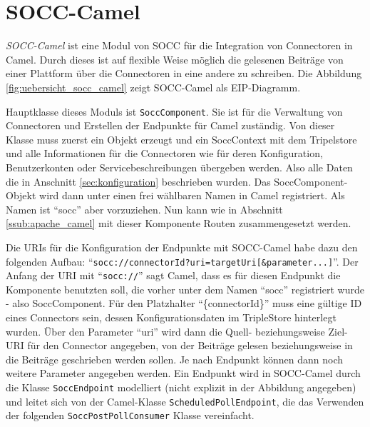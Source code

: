 


\section{SOCC-Camel} %
\label{sec:socc_camel}

\emph{SOCC-Camel} ist eine Modul von SOCC für die Integration von Connectoren in Camel. Durch dieses ist auf flexible Weise möglich die gelesenen Beiträge von einer Plattform über die Connectoren in eine andere zu schreiben. Die Abbildung \ref{fig:uebersicht_socc_camel} zeigt SOCC-Camel als EIP-Diagramm. 

Hauptklasse dieses Moduls ist \texttt{SoccComponent}. Sie ist für die Verwaltung von Connectoren und Erstellen der Endpunkte für Camel zuständig. Von dieser Klasse muss zuerst ein Objekt erzeugt und ein SoccContext mit dem Tripelstore und alle Informationen für die Connectoren wie für deren Konfiguration, Benutzerkonten oder Servicebeschreibungen übergeben werden. Also alle Daten die in Anschnitt \ref{sec:konfiguration} beschrieben wurden. Das SoccComponent-Objekt wird dann unter einen frei wählbaren Namen in Camel registriert. Als Namen ist \enquote{socc} aber vorzuziehen.  Nun kann wie in Abschnitt \ref{ssub:apache_camel} mit dieser Komponente Routen zusammengesetzt werden.

Die URIs für die Konfiguration der Endpunkte mit SOCC-Camel habe dazu den folgenden Aufbau: \enquote{\texttt{socc://{connectorId}?uri={targetUri}[\&{parameter}...]}}. Der Anfang der URI mit \enquote{\texttt{socc://}} sagt Camel, dass es für diesen Endpunkt die Komponente benutzten soll, die vorher unter dem Namen \enquote{socc} registriert wurde - also SoccComponent. Für den Platzhalter \enquote{\{connectorId\}} muss eine gültige ID eines Connectors sein, dessen Konfigurationsdaten im TripleStore hinterlegt wurden. Über den Parameter \enquote{uri} wird dann die Quell- beziehungsweise Ziel-URI für den Connector angegeben, von der Beiträge gelesen beziehungsweise in die Beiträge geschrieben werden sollen. Je nach Endpunkt können dann noch weitere Parameter angegeben werden. Ein Endpunkt wird in SOCC-Camel durch die Klasse \texttt{SoccEndpoint} modelliert (nicht explizit in der Abbildung angegeben) und leitet sich von der Camel-Klasse \texttt{ScheduledPollEndpoint}, die das Verwenden der folgenden \texttt{SoccPostPollConsumer} Klasse vereinfacht.

